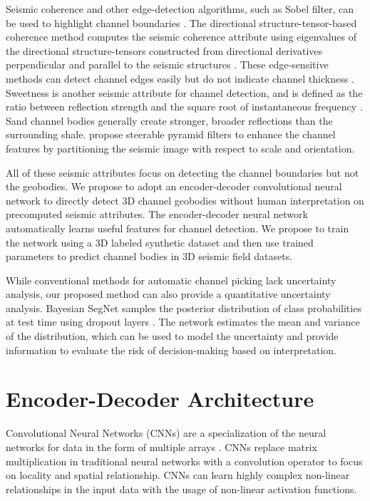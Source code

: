 Seismic coherence and other edge-detection algorithms, such as Sobel filter, can be used to highlight channel boundaries \cite[]{coherence, attributes, Mason}. The directional structure-tensor-based coherence method computes the seismic coherence attribute using eigenvalues of the directional structure-tensors constructed from directional derivatives perpendicular and parallel to the seismic structures \cite[]{coherence}. These edge-sensitive methods can detect channel edges easily but do not indicate channel thickness \cite[]{instantaneous}. Sweetness is another seismic attribute for channel detection, and is defined as the ratio between reflection strength and the square root of instantaneous frequency \cite[]{sweetness}. Sand channel bodies generally create stronger, broader reflections than the surrounding shale. \cite{pyramid} propose steerable pyramid filters to enhance the channel features by partitioning the seismic image with respect to scale and orientation.

All of these seismic attributes focus on detecting the channel boundaries but not the geobodies. We propose to adopt an encoder-decoder convolutional neural network to directly detect 3D channel geobodies without human interpretation on precomputed seismic attributes. The encoder-decoder neural network automatically learns useful features for channel detection. We propose to train the network using a 3D labeled synthetic dataset and then use trained parameters to predict channel bodies in 3D seismic field datasets.

While conventional methods for automatic channel picking lack uncertainty analysis, our proposed method can also provide a quantitative uncertainty analysis. Bayesian SegNet samples the posterior distribution of class probabilities at test time using dropout layers \cite[]{bayesianSegNet}. The network estimates the mean and variance of the distribution, which can be used to model the uncertainty and provide information to evaluate the risk of decision-making based on interpretation. 

\section{Encoder-Decoder Architecture}
Convolutional Neural Networks (CNNs) are a specialization of the neural networks for data in the form of multiple arrays \cite[]{nature}. CNNs replace matrix multiplication in traditional neural networks with a convolution operator to focus on locality and spatial relationship. CNNs can learn highly complex non-linear relationships in the input data with the usage of non-linear activation functions.

